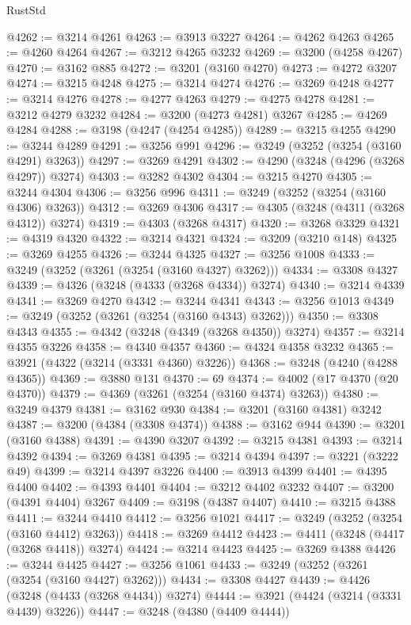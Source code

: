 \begin{lexlean}{RustStd}
\begin{coremodule}
@4262 := @3214 @4261
@4263 := @3913 @3227
@4264 := @4262 @4263
@4265 := @4260 @4264
@4267 := @3212 @4265 @3232
@4269 := @3200 (@4258 @4267)
@4270 := @3162 @885
@4272 := @3201 (@3160 @4270)
@4273 := @4272 @3207
@4274 := @3215 @4248
@4275 := @3214 @4274
@4276 := @3269 @4248
@4277 := @3214 @4276
@4278 := @4277 @4263
@4279 := @4275 @4278
@4281 := @3212 @4279 @3232
@4284 := @3200 (@4273 @4281) @3267
@4285 := @4269 @4284
@4288 := @3198 (@4247 (@4254 @4285))
@4289 := @3215 @4255
@4290 := @3244 @4289
@4291 := @3256 @991
@4296 := @3249 (@3252 (@3254 (@3160 @4291) @3263))
@4297 := @3269 @4291
@4302 := @4290 (@3248 (@4296 (@3268 @4297)) @3274)
@4303 := @3282 @4302
@4304 := @3215 @4270
@4305 := @3244 @4304
@4306 := @3256 @996
@4311 := @3249 (@3252 (@3254 (@3160 @4306) @3263))
@4312 := @3269 @4306
@4317 := @4305 (@3248 (@4311 (@3268 @4312)) @3274)
@4319 := @4303 (@3268 @4317)
@4320 := @3268 @3329
@4321 := @4319 @4320
@4322 := @3214 @4321
@4324 := @3209 (@3210 @148)
@4325 := @3269 @4255
@4326 := @3244 @4325
@4327 := @3256 @1008
@4333 := @3249 (@3252 (@3261 (@3254 (@3160 @4327) @3262)))
@4334 := @3308 @4327
@4339 := @4326 (@3248 (@4333 (@3268 @4334)) @3274)
@4340 := @3214 @4339
@4341 := @3269 @4270
@4342 := @3244 @4341
@4343 := @3256 @1013
@4349 := @3249 (@3252 (@3261 (@3254 (@3160 @4343) @3262)))
@4350 := @3308 @4343
@4355 := @4342 (@3248 (@4349 (@3268 @4350)) @3274)
@4357 := @3214 @4355 @3226
@4358 := @4340 @4357
@4360 := @4324 @4358 @3232
@4365 := @3921 (@4322 (@3214 (@3331 @4360) @3226))
@4368 := @3248 (@4240 (@4288 @4365))
@4369 := @3880 @131
@4370 := 69
@4374 := @4002 (@17 @4370 (@20 @4370))
@4379 := @4369 (@3261 (@3254 (@3160 @4374) @3263))
@4380 := @3249 @4379
@4381 := @3162 @930
@4384 := @3201 (@3160 @4381) @3242
@4387 := @3200 (@4384 (@3308 @4374))
@4388 := @3162 @944
@4390 := @3201 (@3160 @4388)
@4391 := @4390 @3207
@4392 := @3215 @4381
@4393 := @3214 @4392
@4394 := @3269 @4381
@4395 := @3214 @4394
@4397 := @3221 (@3222 @49)
@4399 := @3214 @4397 @3226
@4400 := @3913 @4399
@4401 := @4395 @4400
@4402 := @4393 @4401
@4404 := @3212 @4402 @3232
@4407 := @3200 (@4391 @4404) @3267
@4409 := @3198 (@4387 @4407)
@4410 := @3215 @4388
@4411 := @3244 @4410
@4412 := @3256 @1021
@4417 := @3249 (@3252 (@3254 (@3160 @4412) @3263))
@4418 := @3269 @4412
@4423 := @4411 (@3248 (@4417 (@3268 @4418)) @3274)
@4424 := @3214 @4423
@4425 := @3269 @4388
@4426 := @3244 @4425
@4427 := @3256 @1061
@4433 := @3249 (@3252 (@3261 (@3254 (@3160 @4427) @3262)))
@4434 := @3308 @4427
@4439 := @4426 (@3248 (@4433 (@3268 @4434)) @3274)
@4444 := @3921 (@4424 (@3214 (@3331 @4439) @3226))
@4447 := @3248 (@4380 (@4409 @4444))

\end{coremodule}
\end{lexlean}
